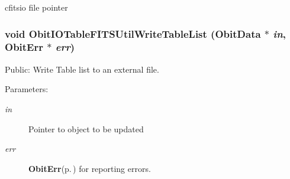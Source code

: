 cfitsio file pointer 
\subsubsection{\setlength{\rightskip}{0pt plus 5cm}void Obit\-IOTable\-FITSUtil\-Write\-Table\-List ({\bf Obit\-Data} $\ast$ {\em in}, {\bf Obit\-Err} $\ast$ {\em err})}\label{ObitIOTableFITSUtil_8c_a1}


Public: Write Table list to an external file. 

\begin{Desc}
\item[Parameters:]
\begin{description}
\item[{\em in}]Pointer to object to be updated \item[{\em err}]{\bf Obit\-Err}{\rm (p.\,\pageref{structObitErr})} for reporting errors. \end{description}
\end{Desc}
